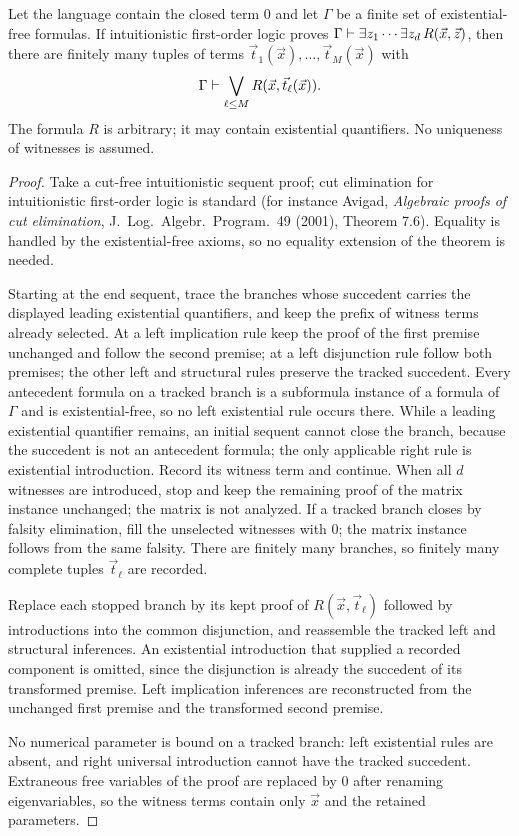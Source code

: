 \begin{lemma}
\label{obs:lem:witness}
Let the language contain the closed term $0$ and let $\Gamma$ be a finite set
of existential-free formulas. If intuitionistic first-order logic proves
$\Gamma\vdash\exists z_1\cdots\exists z_d\,R(\vec x,\vec z)$, then there are
finitely many tuples of terms $\vec t_1(\vec x),\dots,\vec t_M(\vec x)$ with
\[
\Gamma\vdash\bigvee_{\ell\le M}R(\vec x,\vec t_\ell(\vec x)).
\]
The formula $R$ is arbitrary; it may contain existential quantifiers. No
uniqueness of witnesses is assumed.
\end{lemma}

\begin{proof}
Take a cut-free intuitionistic sequent proof; cut elimination for
intuitionistic first-order logic is standard (for instance Avigad,
\emph{Algebraic proofs of cut elimination}, J.~Log.\ Algebr.\ Program.\ 49
(2001), Theorem 7.6). Equality is handled by the existential-free axioms, so no
equality extension of the theorem is needed.

Starting at the end sequent, trace the branches whose succedent carries the
displayed leading existential quantifiers, and keep the prefix of witness terms
already selected. At a left implication rule keep the proof of the first
premise unchanged and follow the second premise; at a left disjunction rule
follow both premises; the other left and structural rules preserve the tracked
succedent. Every antecedent formula on a tracked branch is a subformula
instance of a formula of $\Gamma$ and is existential-free, so no left
existential rule occurs there. While a leading existential quantifier remains,
an initial sequent cannot close the branch, because the succedent is not an
antecedent formula; the only applicable right rule is existential
introduction. Record its witness term and continue. When all $d$ witnesses are
introduced, stop and keep the remaining proof of the matrix instance
unchanged; the matrix is not analyzed. If a tracked branch closes by falsity
elimination, fill the unselected witnesses with $0$; the matrix instance
follows from the same falsity. There are finitely many branches, so finitely
many complete tuples $\vec t_\ell$ are recorded.

Replace each stopped branch by its kept proof of $R(\vec x,\vec t_\ell)$
followed by introductions into the common disjunction, and reassemble the
tracked left and structural inferences. An existential introduction that
supplied a recorded component is omitted, since the disjunction is already the
succedent of its transformed premise. Left implication inferences are
reconstructed from the unchanged first premise and the transformed second
premise.

No numerical parameter is bound on a tracked branch: left existential rules are
absent, and right universal introduction cannot have the tracked succedent.
Extraneous free variables of the proof are replaced by $0$ after renaming
eigenvariables, so the witness terms contain only $\vec x$ and the retained
parameters.
\end{proof}

